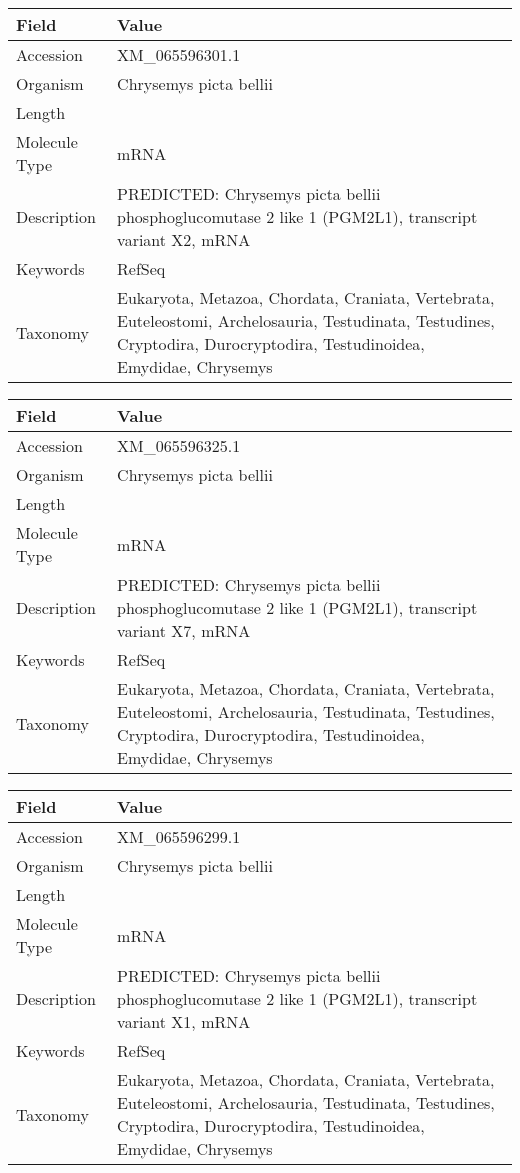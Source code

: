 \documentclass[10pt]{article}
\begin{document}
{\footnotesize
\begin{longtable}{>{\raggedright\arraybackslash}p{4.5cm} >{\raggedright\arraybackslash}p{11.5cm}}
\textbf{Field} & \textbf{Value} \\
\hline
Accession & XM\_065596301.1 \\
Organism & Chrysemys picta bellii \\
Length & 8158 \\
Molecule Type & mRNA \\
Description & PREDICTED: Chrysemys picta bellii phosphoglucomutase 2 like 1 (PGM2L1), transcript variant X2, mRNA \\
Keywords & RefSeq \\
Taxonomy & Eukaryota, Metazoa, Chordata, Craniata, Vertebrata, Euteleostomi, Archelosauria, Testudinata, Testudines, Cryptodira, Durocryptodira, Testudinoidea, Emydidae, Chrysemys \\
\end{longtable}
}

{\footnotesize
\begin{longtable}{>{\raggedright\arraybackslash}p{4.5cm} >{\raggedright\arraybackslash}p{11.5cm}}
\textbf{Field} & \textbf{Value} \\
\hline
Accession & XM\_065596325.1 \\
Organism & Chrysemys picta bellii \\
Length & 13042 \\
Molecule Type & mRNA \\
Description & PREDICTED: Chrysemys picta bellii phosphoglucomutase 2 like 1 (PGM2L1), transcript variant X7, mRNA \\
Keywords & RefSeq \\
Taxonomy & Eukaryota, Metazoa, Chordata, Craniata, Vertebrata, Euteleostomi, Archelosauria, Testudinata, Testudines, Cryptodira, Durocryptodira, Testudinoidea, Emydidae, Chrysemys \\
\end{longtable}
}

{\footnotesize
\begin{longtable}{>{\raggedright\arraybackslash}p{4.5cm} >{\raggedright\arraybackslash}p{11.5cm}}
\textbf{Field} & \textbf{Value} \\
\hline
Accession & XM\_065596299.1 \\
Organism & Chrysemys picta bellii \\
Length & 8059 \\
Molecule Type & mRNA \\
Description & PREDICTED: Chrysemys picta bellii phosphoglucomutase 2 like 1 (PGM2L1), transcript variant X1, mRNA \\
Keywords & RefSeq \\
Taxonomy & Eukaryota, Metazoa, Chordata, Craniata, Vertebrata, Euteleostomi, Archelosauria, Testudinata, Testudines, Cryptodira, Durocryptodira, Testudinoidea, Emydidae, Chrysemys \\
\end{longtable}
}
\end{document}
